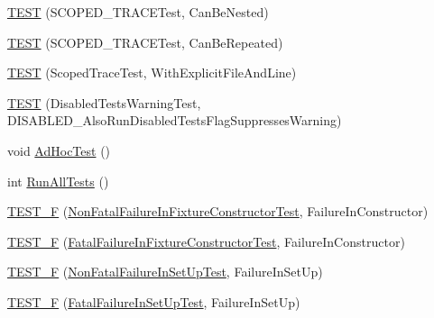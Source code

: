 \begin{DoxyCompactItemize}
\item 
\mbox{\hyperlink{_obj__test_2lib_2googletest-master_2googletest_2test_2googletest-output-test___8cc_ae402e91f305e54f5f14a172a0fb0831b}{T\+E\+ST}} (S\+C\+O\+P\+E\+D\+\_\+\+T\+R\+A\+C\+E\+Test, Can\+Be\+Nested)
\item 
\mbox{\hyperlink{_obj__test_2lib_2googletest-master_2googletest_2test_2googletest-output-test___8cc_a49c4610eeb41adaa369f9dce003d5198}{T\+E\+ST}} (S\+C\+O\+P\+E\+D\+\_\+\+T\+R\+A\+C\+E\+Test, Can\+Be\+Repeated)
\item 
\mbox{\hyperlink{_obj__test_2lib_2googletest-master_2googletest_2test_2googletest-output-test___8cc_aff587c2c7d3e81f4d94425987ca07bc1}{T\+E\+ST}} (Scoped\+Trace\+Test, With\+Explicit\+File\+And\+Line)
\item 
\mbox{\hyperlink{_obj__test_2lib_2googletest-master_2googletest_2test_2googletest-output-test___8cc_a2bdac0e0076d65fa77a967c0fdb46e2a}{T\+E\+ST}} (Disabled\+Tests\+Warning\+Test, D\+I\+S\+A\+B\+L\+E\+D\+\_\+\+Also\+Run\+Disabled\+Tests\+Flag\+Suppresses\+Warning)
\item 
void \mbox{\hyperlink{_obj__test_2lib_2googletest-master_2googletest_2test_2googletest-output-test___8cc_a36cd4d21174efaa3066237d716028d49}{Ad\+Hoc\+Test}} ()
\item 
int \mbox{\hyperlink{_obj__test_2lib_2googletest-master_2googletest_2test_2googletest-output-test___8cc_ae0ca194f6b730e168850ce3179ad4f63}{Run\+All\+Tests}} ()
\item 
\mbox{\hyperlink{_obj__test_2lib_2googletest-master_2googletest_2test_2googletest-output-test___8cc_ad122def39d78da61690433e185611737}{T\+E\+S\+T\+\_\+F}} (\mbox{\hyperlink{class_non_fatal_failure_in_fixture_constructor_test}{Non\+Fatal\+Failure\+In\+Fixture\+Constructor\+Test}}, Failure\+In\+Constructor)
\item 
\mbox{\hyperlink{_obj__test_2lib_2googletest-master_2googletest_2test_2googletest-output-test___8cc_a858b341fa0b2298c1534b1325fedf797}{T\+E\+S\+T\+\_\+F}} (\mbox{\hyperlink{class_fatal_failure_in_fixture_constructor_test}{Fatal\+Failure\+In\+Fixture\+Constructor\+Test}}, Failure\+In\+Constructor)
\item 
\mbox{\hyperlink{_obj__test_2lib_2googletest-master_2googletest_2test_2googletest-output-test___8cc_aaa9d6fcc5d9910aedb42ff3db3cc313c}{T\+E\+S\+T\+\_\+F}} (\mbox{\hyperlink{class_non_fatal_failure_in_set_up_test}{Non\+Fatal\+Failure\+In\+Set\+Up\+Test}}, Failure\+In\+Set\+Up)
\item 
\mbox{\hyperlink{_obj__test_2lib_2googletest-master_2googletest_2test_2googletest-output-test___8cc_a52057afc95d69adbae1fbe0ef92b29d7}{T\+E\+S\+T\+\_\+F}} (\mbox{\hyperlink{class_fatal_failure_in_set_up_test}{Fatal\+Failure\+In\+Set\+Up\+Test}}, Failure\+In\+Set\+Up)

\end{DoxyCompactItemize}
